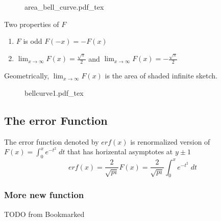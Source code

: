 \begin{figure}[H]
	\centering
	\def\svgwidth{0.5\columnwidth}
	{area_bell_curve.pdf_tex}
\end{figure}
Two properties of $F$
\begin{enumerate}

    \item $F$ is odd $F(-x) = - F(x) $
	\item $\lim_{x \to \infty} F(x) = \frac{\sqrt{\pi}}{2}$ and $\lim_{x \to \infty} F(x) = - \frac{\sqrt{\pi}}{2}$

\end{enumerate}
Geometrically, $\lim_{x \to  \infty}  F(x)$  is the area of shaded infinite sketch. 
\begin{figure}[H]
	\centering
	\def\svgwidth{0.5\columnwidth}
	{bellcurve1.pdf_tex}
\end{figure}

\subsection{ The error Function}
The error function denoted by $erf(x)$ is renormalized version of $F(x) = \int_{0}^{x} e^{-t^{2}} \; dt$ 
that has horizental asymptotes at $y \pm 1$ 
   \[
	erf(x) = \frac{2}{\sqrt{pi}} F(x) = \frac{2}{\sqrt{pi}} \int_{0}^{x} e^{-t^{2}} \; dt
   \]
   \subsubsection{More new function} 
   TODO	 from Bookmarked

